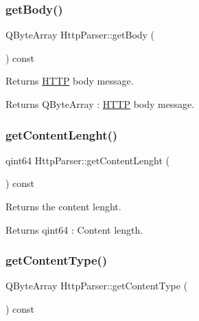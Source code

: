 \subsubsection{\texorpdfstring{get\+Body()}{getBody()}}
{\footnotesize\ttfamily Q\+Byte\+Array Http\+Parser\+::get\+Body (\begin{DoxyParamCaption}{ }\end{DoxyParamCaption}) const}



Returns \hyperlink{namespace_h_t_t_p}{H\+T\+TP} body message. 

\begin{DoxyReturn}{Returns}
Q\+Byte\+Array \+: \hyperlink{namespace_h_t_t_p}{H\+T\+TP} body message. 
\end{DoxyReturn}
\mbox{\label{class_http_parser_ad42f6a0ff6ab987ccf526ac995af196f}} 
\subsubsection{\texorpdfstring{get\+Content\+Lenght()}{getContentLenght()}}
{\footnotesize\ttfamily qint64 Http\+Parser\+::get\+Content\+Lenght (\begin{DoxyParamCaption}{ }\end{DoxyParamCaption}) const}



Returns the content lenght. 

\begin{DoxyReturn}{Returns}
qint64 \+: Content length. 
\end{DoxyReturn}
\mbox{\label{class_http_parser_a3adf500c4b0cf85d8249e071a7094f20}} 
\subsubsection{\texorpdfstring{get\+Content\+Type()}{getContentType()}}
{\footnotesize\ttfamily Q\+Byte\+Array Http\+Parser\+::get\+Content\+Type (\begin{DoxyParamCaption}{ }\end{DoxyParamCaption}) const}



